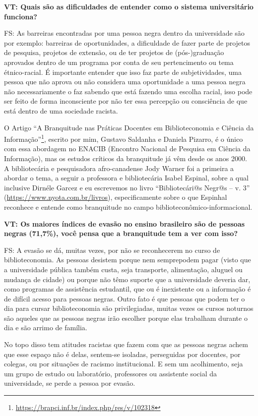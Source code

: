 \documentclass[a4paper,
fontsize=11pt,
oneside,
numbers=noperiodatend,
parskip=half-,
bibliography=totoc,
final
]{scrartcl}
\begin{document}
\textbf{VT: Quais são as dificuldades de entender como o sistema
universitário funciona?}

FS: As barreiras encontradas por uma pessoa negra dentro da universidade
são por exemplo: barreiras de oportunidades, a dificuldade de fazer
parte de projetos de pesquisa, projetos de extensão, ou de ter projetos
de (pós-)graduação aprovados dentro de um programa por conta de seu
pertencimento ou tema étnico-racial. É importante entender que isso faz
parte de subjetividades, uma pessoa que não aprova ou não considera uma
oportunidade a uma pessoa negra não necessariamente o faz sabendo que
está fazendo uma escolha racial, isso pode ser feito de forma
inconsciente por não ter essa percepção ou consciência de que está
dentro de uma sociedade racista.

O Artigo \enquote{A Branquitude nas Práticas Docentes em Biblioteconomia
e Ciência da Informação}\footnote{\url{https://brapci.inf.br/index.php/res/v/102318}},
escrito por mim, Gustavo Saldanha e Daniela Pizarro, é o único com essa
abordagem no ENACIB (Encontro Nacional de Pesquisa em Ciência da
Informação), mas os estudos críticos da branquitude já vêm desde os anos
2000. A bibliotecária e pesquisadora afro-canadense Jody Warner foi a
primeira a abordar o tema, a seguir a professora e bibliotecária Isabel
Espinal, sobre a qual inclusive Dirnéle Garcez e eu escrevemos no livro
\enquote{Bibliotecári@s Negr@s -- v. 3}
(\url{https://www.nyota.com.br/livros}), especificamente sobre o que
Espinhal reconhece e entende como branquitude no campo
biblioteconômico-informacional.

\textbf{VT: Os maiores índices de evasão no ensino brasileiro são de
pessoas negras (71,7\%), você pensa que a branquitude tem a ver com
isso?}

FS: A evasão se dá, muitas vezes, por não se reconhecerem no curso de
biblioteconomia. As pessoas desistem porque nem semprepodem pagar (visto
que a universidade pública também custa, seja transporte, alimentação,
aluguel ou mudança de cidade) ou porque não têmo suporte que a
universidade deveria dar, como programas de assistência estudantil, que
ou é inexistente ou a informação é de difícil acesso para pessoas
negras. Outro fato é que pessoas que podem ter o dia para cursar
biblioteconomia são privilegiadas, muitas vezes os cursos noturnos são
aqueles que as pessoas negras irão escolher porque elas trabalham
durante o dia e são arrimo de família.

No topo disso tem atitudes racistas que fazem com que as pessoas negras
achem que esse espaço não é delas, sentem-se isoladas, perseguidas por
docentes, por colegas, ou por situações de racismo institucional. E sem
um acolhimento, seja um grupo de estudo ou laboratório, professores ou
assistente social da universidade, se perde a pessoa por evasão.
\end{document}
